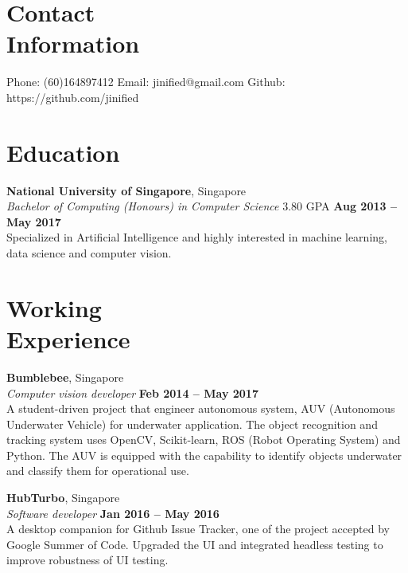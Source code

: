 \documentclass[margin,line]{resume}
\begin{document}
\begin{resume}
    \section{\mysidestyle Contact\\Information}

    Phone: (60)164897412       \hfill Email: jinified@gmail.com  \hfill Github:
    https://github.com/jinified \vspace{0mm}\\\vspace{-4.5mm}

    \section{\mysidestyle Education}

    \textbf{National University of Singapore}, Singapore \vspace{2mm}\\\vspace{1mm}%
    \textsl{Bachelor of Computing (Honours) in Computer Science} 3.80 GPA \hfill \textbf{Aug 2013 -- May 2017}\\
    Specialized in Artificial Intelligence and highly interested in machine
    learning, data science and computer vision.

    \section{\mysidestyle Working\\Experience}

    \textbf{Bumblebee}, Singapore \vspace{2mm}\\\vspace{1mm}%
    \textsl{Computer vision developer} \hfill \textbf{Feb 2014 -- May 2017}\\
    A student-driven project that engineer autonomous system, AUV (Autonomous
    Underwater Vehicle) for underwater application. The object recognition and
    tracking system uses OpenCV, Scikit-learn, ROS (Robot Operating System) and
    Python. The AUV is equipped with the capability to identify objects
    underwater and classify them for operational use.
    
    \textbf{HubTurbo}, Singapore \vspace{2mm}\\\vspace{1mm}%
    \textsl{Software developer} \hfill \textbf{Jan 2016 -- May 2016}\\
    A desktop companion for Github Issue Tracker, one of the project accepted by Google Summer of
    Code. Upgraded the UI and integrated headless testing to improve robustness
    of UI testing.


\end{resume}
\end{document}

